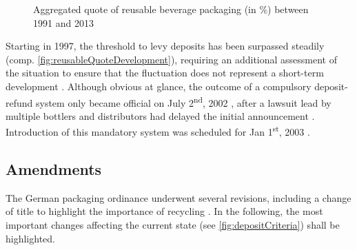 \begin{figure}[hbt]
	\centering
  	\caption{Aggregated quote of reusable beverage packaging (in \%) between 1991 and 2013 \cite[p.~1]{BMU2015} }
  	\label{fig:reusableQuoteDevelopment}
\end{figure}

Starting in 1997, the threshold to levy deposits has been surpassed steadily (comp. \autoref{fig:reusableQuoteDevelopment}), requiring an additional assessment of the situation to ensure that the fluctuation does not represent a short-term development \cite[§ 9]{verpackV1991} \cite[p.~5]{Hartlep2011Recycling}. Although obvious at glance, the outcome of a compulsory deposit-refund system only became official on July 2\textsuperscript{nd}, 2002 \cite[p.~49]{Geyer/Smoltczyk2003}, after a lawsuit lead by multiple bottlers and distributors had delayed the initial announcement \cite{spon2011handel}. Introduction of this mandatory system was scheduled for Jan 1\textsuperscript{st}, 2003 \cite[p.~53]{Geyer/Smoltczyk2003}.

\subsection{Amendments}
The German packaging ordinance underwent several revisions, including a change of title to highlight the importance of recycling \cite{verpackV1998}. In the following, the most important changes affecting the current state (see \autoref{fig:depositCriteria}) shall be highlighted.


